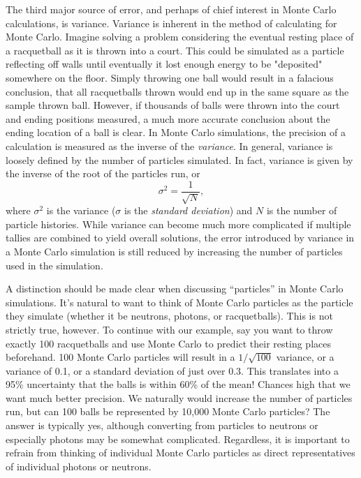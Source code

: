 The third major source of error, and perhaps of chief interest in Monte Carlo calculations, is variance.  Variance is inherent in the method of calculating for Monte Carlo.  Imagine solving a problem considering the eventual resting place of a racquetball as it is thrown into a court.  This could be simulated as a particle reflecting off walls until eventually it lost enough energy to be "deposited" somewhere on the floor.  Simply throwing one ball would result in a falacious conclusion, that all racquetballs thrown would end up in the same square as the sample thrown ball.  However, if thousands of balls were thrown into the court and ending positions measured, a much more accurate conclusion about the ending location of a ball is clear.  In Monte Carlo simulations, the precision of a calculation is measured as the inverse of the \emph{variance}.  In general, variance is loosely defined by the number of particles simulated.  In fact, variance is given by the inverse of the root of the particles run, or
\begin{equation}
\sigma^2=\frac{1}{\sqrt{N}},
\end{equation}
where $\sigma^2$ is the variance ($\sigma$ is the \emph{standard deviation}) and $N$ is the number of particle histories.  While variance can become much more complicated if multiple tallies are combined to yield overall solutions, the error introduced by variance in a Monte Carlo simulation is still reduced by increasing the number of particles used in the simulation.

A distinction should be made clear when discussing ``particles'' in Monte Carlo simulations.  It's natural to want to think of Monte Carlo particles as the particle they simulate (whether it be neutrons, photons, or racquetballs).  This is not strictly true, however.  To continue with our example, say you want to throw exactly 100 racquetballs and use Monte Carlo to predict their resting places beforehand.  100 Monte Carlo particles will result in a $1/\sqrt{100}$ variance, or a variance of 0.1, or a standard deviation of just over 0.3.  This translates into a 95\% uncertainty that the balls is within 60\% of the mean!  Chances high that we want much better precision.  We naturally would increase the number of particles run, but can 100 balls be represented by 10,000 Monte Carlo particles?  The answer is typically yes, although converting from particles to neutrons or especially photons may be somewhat complicated.  Regardless, it is important to refrain from thinking of individual Monte Carlo particles as direct representatives of individual photons or neutrons.


